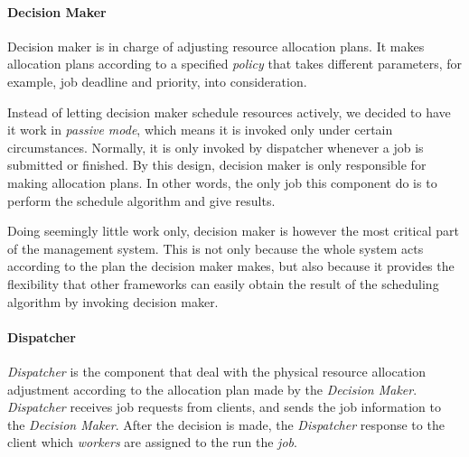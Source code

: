 \paragraph{Decision Maker}	%

Decision maker is in charge of adjusting resource allocation plans.
It makes allocation plans according to a specified {\em policy} that
takes different parameters, for example, job deadline and priority, into
consideration. 

Instead of letting decision maker schedule resources actively, we
decided to have it work in {\em passive mode}, which means it is invoked
only under certain circumstances.
Normally, it is only invoked by dispatcher whenever a job is submitted
or finished.
By this design, decision maker is only responsible for making allocation
plans.
In other words, the only job this component do is to perform the
schedule algorithm and give results.

Doing seemingly little work only, decision maker is however the most
critical part of the management system.
This is not only because the whole system acts according to the plan the
decision maker makes, but also because it provides the flexibility that
other frameworks can easily obtain the result of the scheduling
algorithm by invoking decision maker.

\paragraph{Dispatcher}	%

{\em Dispatcher} is the component that deal with the physical resource
allocation adjustment according to the allocation plan made by the {\em
Decision Maker}.
{\em Dispatcher} receives job requests from clients, and sends the job
information to the {\em Decision Maker}.
After the decision is made, the {\em Dispatcher} response to the client
which {\em workers} are assigned to the run the {\em job}.



%  




